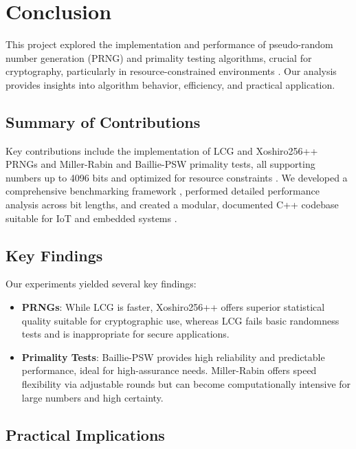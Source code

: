 \section{Conclusion}

This project explored the implementation and performance of pseudo-random number generation (PRNG) and primality testing algorithms, crucial for cryptography, particularly in resource-constrained environments \cite{resource_constrained}. Our analysis provides insights into algorithm behavior, efficiency, and practical application.

\subsection{Summary of Contributions}

Key contributions include the implementation of LCG and Xoshiro256++ PRNGs and Miller-Rabin and Baillie-PSW primality tests, all supporting numbers up to 4096 bits and optimized for resource constraints \cite{energy_efficient}. We developed a comprehensive benchmarking framework \cite{embedded_benchmarking}, performed detailed performance analysis across bit lengths, and created a modular, documented C++ codebase suitable for IoT and embedded systems \cite{iot_survey}.

\subsection{Key Findings}

Our experiments yielded several key findings:

\begin{itemize}
    \item \textbf{PRNGs}: While LCG is faster, Xoshiro256++ offers superior statistical quality suitable for cryptographic use, whereas LCG fails basic randomness tests and is inappropriate for secure applications.
    \item \textbf{Primality Tests}: Baillie-PSW provides high reliability and predictable performance, ideal for high-assurance needs. Miller-Rabin offers speed flexibility via adjustable rounds but can become computationally intensive for large numbers and high certainty.
\end{itemize}

\subsection{Practical Implications}


